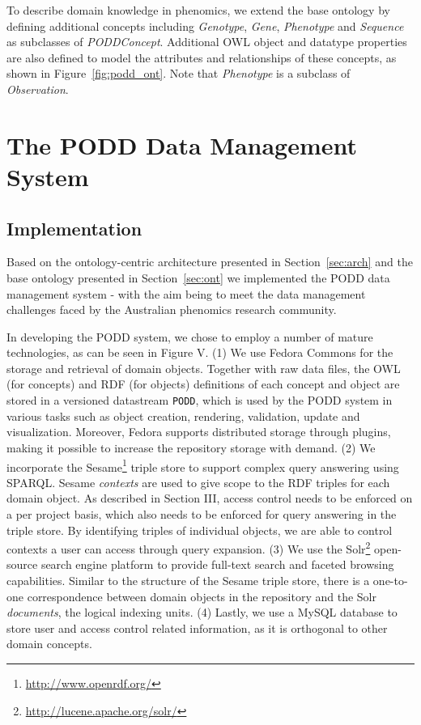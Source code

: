 \documentclass[conference,10pt]{IEEEtran}
\begin{document}
To describe domain knowledge in phenomics, we extend the base ontology by defining additional concepts including \emph{Genotype}, \emph{Gene}, \emph{Phenotype} and \emph{Sequence} as subclasses of \emph{PODDConcept}. Additional OWL object and datatype properties are also defined to model the attributes and relationships of these concepts, as shown in Figure~\ref{fig:podd_ont}. Note that \emph{Phenotype} is a subclass of \emph{Observation}. 

\section{The PODD Data Management System}\label{sec:sys}
\subsection{Implementation}
Based on the ontology-centric architecture presented in Section~\ref{sec:arch} and the base ontology presented in Section~\ref{sec:ont} we implemented the PODD data management system - with the aim being to meet the data management challenges faced by the Australian phenomics research community. 

In developing the PODD system, we chose to employ a number of mature technologies, as can be seen in Figure V. (1) We use Fedora Commons for the storage and retrieval of domain objects. Together with raw data files, the OWL (for concepts) and RDF (for objects) definitions of each concept and object are stored in a versioned datastream \texttt{PODD}, which is used by the PODD system in various tasks such as object creation, rendering, validation, update and visualization. Moreover, Fedora supports distributed storage through plugins, making it possible to increase the repository storage with demand. (2) We incorporate the Sesame\footnote{\url{http://www.openrdf.org/}} triple store to support complex query answering using SPARQL. Sesame \emph{contexts} are used to give scope to the RDF triples for each domain object. As described in Section III, access control needs to be enforced on a per project basis, which also needs to be enforced for query answering in the triple store. By identifying triples of individual objects, we are able to control contexts a user can access through query expansion. (3) We use the Solr\footnote{\url{http://lucene.apache.org/solr/}} open-source search engine platform to provide full-text search and faceted browsing capabilities. Similar to the structure of the Sesame triple store, there is a one-to-one correspondence between domain objects in the repository and the Solr \emph{documents}, the logical indexing units. (4) Lastly, we use a MySQL database to store user and access control related information, as it is orthogonal to other domain concepts.
\end{document}
